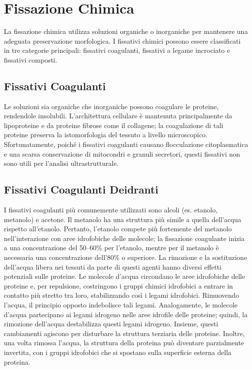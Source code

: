 \section{Fissazione Chimica}
La fissazione chimica utilizza soluzioni organiche o inorganiche per mantenere una adeguata preservazione morfologica. I fissativi chimici possono essere classificati in tre categorie principali: fissativi coagulanti, fissativi a legame incrociato e fissativi composti.

\subsection{Fissativi Coagulanti}
Le soluzioni sia organiche che inorganiche possono coagulare le proteine, rendendole insolubili. L'architettura cellulare è mantenuta principalmente da lipoproteine e da proteine fibrose come il collagene; la coagulazione di tali proteine preserva la istomorfologia del tessuto a livello microscopico. Sfortunatamente, poiché i fissativi coagulanti causano flocculazione citoplasmatica e una scarsa conservazione di mitocondri e granuli secretori, questi fissativi non sono utili per l'analisi ultrastrutturale.

\subsection{Fissativi Coagulanti Deidranti}
I fissativi coagulanti più comunemente utilizzati sono alcoli (es. etanolo, metanolo) e acetone. Il metanolo ha una struttura più simile a quella dell'acqua rispetto all'etanolo. Pertanto, l'etanolo compete più fortemente del metanolo nell'interazione con aree idrofobiche delle molecole; la fissazione coagulante inizia a una concentrazione del 50–60\% per l'etanolo, mentre per il metanolo è necessaria una concentrazione dell'80\% o superiore. La rimozione e la sostituzione dell'acqua libera nei tessuti da parte di questi agenti hanno diversi effetti potenziali sulle proteine. Le molecole d'acqua circondano le aree idrofobiche delle proteine e, per repulsione, costringono i gruppi chimici idrofobici a entrare in contatto più stretto tra loro, stabilizzando così i legami idrofobici. Rimuovendo l'acqua, il principio opposto indebolisce tali legami. Analogamente, le molecole d'acqua partecipano ai legami idrogeno nelle aree idrofile delle proteine; quindi, la rimozione dell'acqua destabilizza questi legami idrogeno. Insieme, questi cambiamenti agiscono per disturbare la struttura terziaria delle proteine. Inoltre, una volta rimossa l'acqua, la struttura della proteina può diventare parzialmente invertita, con i gruppi idrofobici che si spostano sulla superficie esterna della proteina. 



